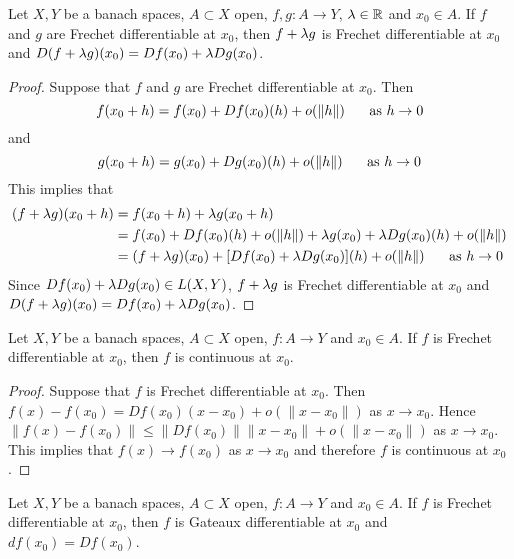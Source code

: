 \documentclass{book}
\begin{document}
	\begin{ex} 
	Let $X, Y$ be a banach spaces, $A \subset X$ open, $f,g:A \rightarrow Y$, $\lambda \in \mathbb{R}$ and $x_0 \in A$. If $f$ and $g$ are Frechet differentiable at $x_0$, then $f+ \lambda g$ is Frechet differentiable at $x_0$ and $D(f+\lambda g)(x_0) = Df(x_0) + \lambda Dg(x_0)$.
	\end{ex}
	
	\begin{proof}
	Suppose that $f$ and $g$ are Frechet differentiable at $x_0$. Then $$f(x_0 + h) = f(x_0) + Df(x_0)(h) + o(\|h\| ) \hspace{.5cm} \text{ as } h \rightarrow 0$$  and $$g(x_0 + h) = g(x_0) + Dg(x_0)(h) + o(\|h\| ) \hspace{.5cm} \text{ as } h \rightarrow 0$$  
	This implies that 
	\begin{align*}
	(f+\lambda g)(x_0 + h) 
	&= f(x_0 + h) +\lambda g(x_0 + h) \\
	&= f(x_0) + Df(x_0)(h) + o(\|h\| ) + \lambda g(x_0) + \lambda Dg(x_0)(h) + o(\|h\| ) \\
	&= (f+\lambda g)(x_0) + [Df(x_0)+ \lambda Dg(x_0)](h) + o(\|h\|) \hspace{.5cm} \text{ as } h \rightarrow 0
	\end{align*}
	Since $Df(x_0)+\lambda Dg(x_0) \in L(X,Y)$, $f+\lambda g$ is Frechet differentiable at $x_0$ and $D(f+\lambda g)(x_0) = Df(x_0) + \lambda Dg(x_0)$. 
	\end{proof}
	
	\begin{ex}
	Let $X, Y$ be a banach spaces, $A \subset X$ open, $f:A \rightarrow Y$ and $x_0 \in A$. If $f$ is Frechet differentiable at $x_0$, then $f$ is continuous at $x_0$. 
	\end{ex}
	
	\begin{proof}
	Suppose that $f$ is Frechet differentiable at $x_0$. Then $f(x) - f(x_0) = Df(x_0)(x - x_0) + o(\|x - x_0\|)$ as $x \rightarrow x_0$. Hence $\|f(x) - f(x_0)\| \leq \| Df(x_0)\| \|x - x_0 \| + o(\|x - x_0\|)$ as $x \rightarrow x_0$. This implies that $f(x) \rightarrow f(x_0)$ as $x \rightarrow x_0$ and therefore $f$ is continuous at $x_0$.
	\end{proof}
	
	\begin{ex} 
	Let $X, Y$ be a banach spaces, $A \subset X$ open, $f:A \rightarrow Y$ and $x_0 \in A$. If $f$ is Frechet differentiable at $x_0$, then $f$ is Gateaux differentiable at $x_0$ and $df(x_0) = Df(x_0)$.
	\end{ex}
	
\end{document}
